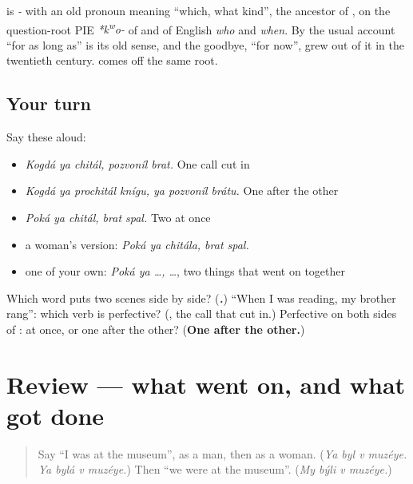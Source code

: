 \begin{cousinweb}
\textbf{} is \emph{-} with an old pronoun meaning \textquotedblleft{}which, what kind\textquotedblright{}, the ancestor of \emph{}, on the question-root PIE \emph{*k\textsuperscript{w}o-} of \emph{} and of English \emph{who} and \emph{when}. By the usual account \textquotedblleft{}for as long as\textquotedblright{} is its old sense, and the goodbye, \textquotedblleft{}for now\textquotedblright{}, grew out of it in the twentieth century. \textbf{} comes off the same root.
\end{cousinweb}

\subsection*{Your turn}
Say these aloud:

\begin{itemize}
\raggedright
  \item \emph{Kogdá ya chitál, pozvoníl brat.} One call cut in
  \item \emph{Kogdá ya prochitál knígu, ya pozvoníl brátu.} One after the other
  \item \emph{Poká ya chitál, brat spal.} Two at once
  \item a woman's version: \emph{Poká ya chitála, brat spal.}
  \item one of your own: \emph{Poká ya …, …}, two things that went on together
\end{itemize}

\begin{tcolorbox}[breakable,colback=teal!4,colframe=teal!35!black,title={Before you move on}]
Which word puts two scenes side by side? (\emph{\textbf{.}}) \textquotedblleft{}When I was reading, my brother rang\textquotedblright{}: which verb is perfective? (\emph{\textbf{}}, the call that cut in.) Perfective on both sides of \emph{}: at once, or one after the other? (\textbf{One after the other.})
\end{tcolorbox}
\section[(review)]{Review — what went on, and what got done}

\label{lesson:RU-C261-review}



\begin{quote}
Say \textquotedblleft{}I was at the museum\textquotedblright{}, as a man, then as a woman. (\emph{Ya byl v muzéye. Ya bylá v muzéye.}) Then \textquotedblleft{}we were at the museum\textquotedblright{}. (\emph{My býli v muzéye.})
\end{quote}


